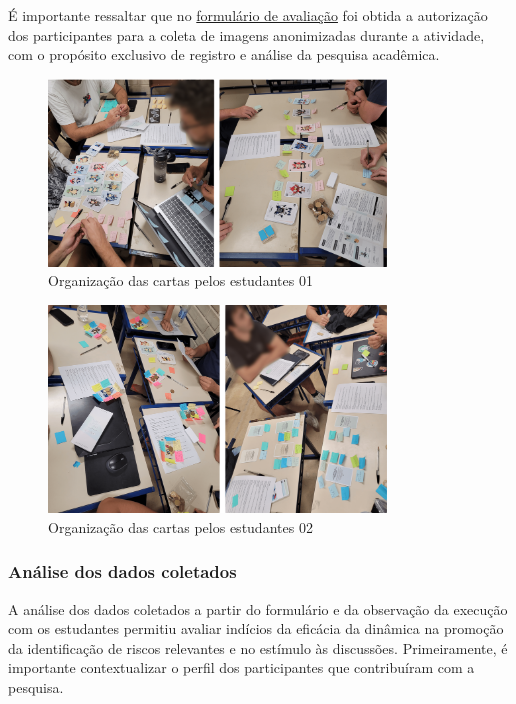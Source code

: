 \documentclass[
	12pt,
	openright,
	twoside,
	a4paper,
	english,
	brazil
	]{abntex2}
\begin{document}
É importante ressaltar que no \href{https://docs.google.com/forms/d/e/1FAIpQLScbPFAv1rF65qF6yrF8nZSy4OGXmDVoPEyInE8BfWjhVfKAkw/viewform?usp=dialog}{formulário de avaliação} foi obtida a autorização dos participantes para a coleta de imagens anonimizadas durante a atividade, com o propósito exclusivo de registro e análise da pesquisa acadêmica.

\begin{figure}[H]
  \centering
	\caption{\label{aplicacao-aula-mesa-1} Organização das cartas pelos estudantes 01}
  \includegraphics[width=0.8\textwidth]{aplicacao-aula-mesa-1}
\end{figure}

\begin{figure}[H]
  \centering
	\caption{\label{aplicacao-aula-mesa-2} Organização das cartas pelos estudantes 02}
  \includegraphics[width=0.8\textwidth]{aplicacao-aula-mesa-2}
\end{figure}

\subsubsection{Análise dos dados coletados}

A análise dos dados coletados a partir do formulário e da observação da execução com os estudantes permitiu avaliar indícios da eficácia da dinâmica na promoção da identificação de riscos relevantes e no estímulo às discussões. Primeiramente, é importante contextualizar o perfil dos participantes que contribuíram com a pesquisa.
\end{document}
